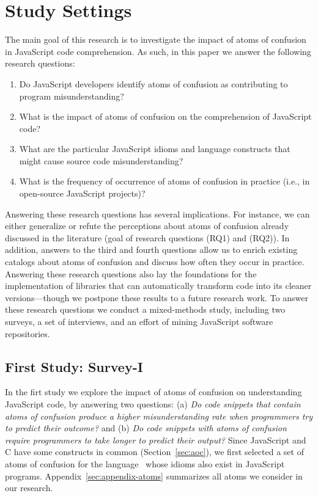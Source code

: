 \section{Study Settings}
\label{method}

The main goal of this research is to investigate the impact of atoms of confusion in JavaScript code comprehension. As such, in this paper we answer the following research questions: 

\begin{enumerate}[(RQ1)]
    \item Do JavaScript developers identify atoms of confusion as contributing to program misunderstanding? 
    \item What is the impact of atoms of confusion on the comprehension of JavaScript code? 
    \item What are the particular JavaScript idioms and language constructs that might cause source code misunderstanding?
    \item What is the frequency of occurrence of atoms of confusion in practice (i.e., in open-source JavaScript projects)?
\end{enumerate}

 
Answering these research questions has several implications. For instance, we can either generalize or refute the perceptions about atoms of confusion already discussed in the literature (goal of research questions (RQ1) and (RQ2)). In addition, answers to the third and fourth questions allow us to enrich existing catalogs about atoms of confusion and discuss how often they occur in practice. Answering these research questions also lay the foundations for the implementation of libraries that can automatically transform code into its cleaner versions---though we postpone these results to a future research work. To answer these research questions we conduct a mixed-methods study, including {\color{red}two surveys}, a set of interviews, and an effort of mining JavaScript software repositories.  


\subsection{First Study: Survey-I}



In the firt study we explore the impact of atoms of confusion on
understanding JavaScript code, by answering two questions: (a) \emph{Do code snippets that contain atoms of confusion produce a higher misunderstanding rate when programmers try to predict their outcome?} and (b) \emph{Do code snippets with atoms of confusion require programmers to take longer to predict their output?}
Since JavaScript and C have some constructs in common (Section~\ref{sec:aoc}), we first selected a set of atoms of confusion for the \clang language~\cite{DBLP:conf/sigsoft/GopsteinIYDZYC17} whose idioms also exist in JavaScript programs. Appendix~\ref{sec:appendix-atoms} summarizes all atoms we consider in our research. 

